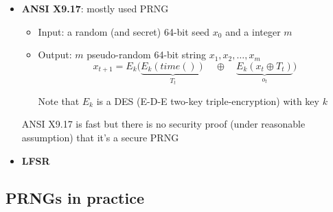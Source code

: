 \begin{itemize}
    \item \textbf{ANSI X9.17}: mostly used PRNG 

        \begin{itemize}
            \item Input: a random (and secret) 64-bit seed $x_0$ and a integer $m$
            \item Output: $m$ pseudo-random 64-bit string $x_1,x_2,\ldots,x_m$
                $$x_{t+1} = E_k\bigg(\underbrace{E_k(time())}_{T_t}
                \quad \oplus \quad \underbrace{E_k(x_t \oplus
                T_t)}_{o_t}\bigg)$$
            \item[Note] that $E_k$ is a DES (E-D-E two-key
                triple-encryption) with key $k$
        \end{itemize}

        ANSI X9.17 is fast but there is no security proof (under
        reasonable assumption) that it's a secure PRNG

    \item \textbf{LFSR}
        \begin{center}
        \end{center}

\end{itemize}


\subsection{PRNGs in practice}

